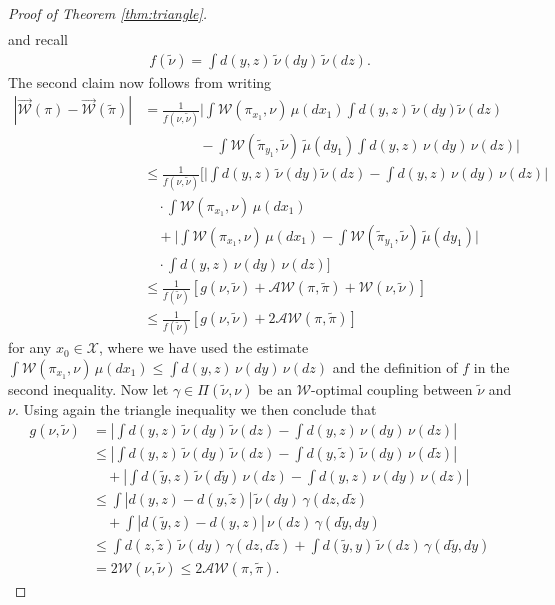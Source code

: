 \documentclass[10pt]{amsart}
\begin{document}
\begin{appendix}
\begin{proof}[Proof of Theorem \ref{thm:triangle}]
\begin{align*}
\end{align*}
and recall 
\begin{align*}
f(\tilde{\nu})= \int  d(y,z)\,\tilde{\nu}(dy)\,\tilde{\nu}(dz).
\end{align*}
The second claim now follows from writing
\begin{align*}
\left| \overrightarrow{\mathcal{W}}(\pi)-\overrightarrow{\mathcal{W}}(\tilde{\pi}) \right|&=\frac{1}{f(\nu,\tilde{\nu})} \Bigg| \int \mathcal{W}(\pi_{x_1}, \nu)\,\mu(dx_1) \int d(y,z)\,\tilde{\nu}(dy)\tilde{\nu}(dz) \\
&\qquad\qquad- \int \mathcal{W}(\tilde{\pi}_{y_1}, \tilde{\nu})\,\tilde{\mu}(dy_1)  \int d(y,z)\,\nu(dy)\,\nu(dz) \Bigg|\\
&\le \frac{1}{f(\nu,\tilde{\nu})} \Bigg[\Bigg|\int d(y,z)\,\tilde{\nu}(dy)\tilde{\nu}(dz)-\int d(y,z)\,\nu(dy)\,\nu(dz) \Bigg|\\
&\quad \cdot \int \mathcal{W}(\pi_{x_1}, \nu)\,\mu(dx_1)\\
&\quad + \Bigg| \int \mathcal{W}(\pi_{x_1}, \nu)\,\mu(dx_1) -\int \mathcal{W}(\tilde{\pi}_{y_1}, \tilde{\nu})\,\tilde{\mu}(dy_1) \Bigg|\\
&\quad \cdot \int d(y,z)\,\nu(dy)\,\nu(dz) \Bigg]\\
&\le \frac{1}{f(\tilde{\nu})}  \left[ g(\nu,\tilde{\nu})+\mathcal{AW}(\pi, \tilde{\pi})+\mathcal{W}(\nu,\tilde{\nu}) \right]\\
&\le \frac{1 }{f(\tilde{\nu})}  \left[g(\nu,\tilde{\nu})+ 2\mathcal{AW}(\pi, \tilde{\pi})\right]
\end{align*}
for any $x_0\in \mathcal{X}$, where we have used the estimate $\int \mathcal{W}(\pi_{x_1}, \nu)\,\mu(dx_1)\le \int d(y,z)\,\nu(dy)\,\nu(dz)$ and the definition of $f$ in the second inequality. Now let $\gamma\in \Pi(\tilde{\nu}, \nu)$ be an $\mathcal{W}$-optimal coupling between $\tilde{\nu}$ and $\nu$. Using again the triangle inequality we then conclude that
\begin{align*}
 g(\nu,\tilde{\nu})&= \left|\int d(y, z) \,\tilde{\nu}(dy)\, \tilde{\nu}(dz) - \int d(y, z)\, \nu(dy) \,\nu(dz)  \right|\\
 &\le \left|\int d(y, z) \,\tilde{\nu}(dy)\, \tilde{\nu}(dz) -\int d(y, \tilde{z})\, \tilde{\nu}(dy)\,\nu(d\tilde{z}) \right| \\
 &\quad +\left| \int d(\tilde{y}, z) \,\tilde{\nu}(d\tilde{y}) \,\nu(dz) - \int d(y, z)\, \nu(dy) \,\nu(dz)  \right| \\
 &\le \int   |d(y, z)-d(y, \tilde{z})| \,\tilde{\nu}(dy)\, \gamma(dz,d\tilde{z})\\
 &\quad +\int   |d(\tilde{y}, z)-d(y, z)| \,\nu(dz)\, \gamma(d\tilde{y},dy)\\
 &\le \int   d(z,\tilde{z}) \,\tilde{\nu}(dy)\, \gamma(dz,d\tilde{z})+ \int   d(\tilde{y},y) \,\tilde{\nu}(dz)\, \gamma(d\tilde{y},dy)\\
 &= 2 \mathcal{W}(\nu, \tilde{\nu})\le 2\mathcal{AW}(\pi, \tilde{\pi}).
\end{align*} 



\end{proof}
\end{appendix}
\end{document}
